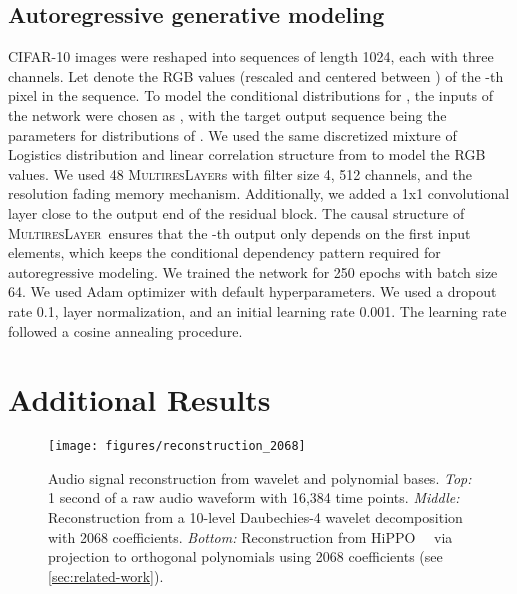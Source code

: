 \documentclass{article}
\theoremstyle{plain}
\theoremstyle{definition}
\theoremstyle{remark}
\newcommand{\ourlayer}{\textsc{MultiresLayer}}
\begin{document}
\subsection{Autoregressive generative modeling}
\label{app:ar-details}

CIFAR-10 images were reshaped into sequences of length 1024, each with three channels. 
Let  denote the RGB values (rescaled and centered between ) of the -th pixel in the sequence. 
To model the conditional distributions  for , the inputs of the network were chosen as , with the target output sequence being the parameters for distributions of . 
We used the same discretized mixture of Logistics distribution and linear correlation structure from \citet{salimans2017pixelcnn} to model the RGB values.
We used 48 \ourlayer s with filter size 4, 512 channels, and the resolution fading memory mechanism.
Additionally, we added a 1x1 convolutional layer close to the output end of the residual block. 
The causal structure of \ourlayer\ ensures that the -th output only depends on the first  input elements, which keeps the conditional dependency pattern required for autoregressive modeling.  
We trained the network for 250 epochs with batch size 64.
We used Adam optimizer with default hyperparameters. 
We used a dropout rate 0.1, layer normalization, and an initial learning rate 0.001. 
The learning rate followed a cosine annealing procedure. 

\section{Additional Results}
\label{app:other-exps}

\begin{figure}[h]
    \texttt{[image: figures/reconstruction\_2068]}
    \centering
    \vspace{-3mm}
    \caption{Audio signal reconstruction from wavelet and polynomial bases. \emph{Top:} 1 second of a raw audio waveform with 16,384 time points. \emph{Middle:} Reconstruction from a 10-level Daubechies-4 wavelet decomposition with 2068 coefficients. \emph{Bottom:} Reconstruction from HiPPO~~\citep{gu2020hippo} via projection to orthogonal polynomials using 2068 coefficients (see \cref{sec:related-work}).}  \vspace{-4mm}
\label{fig:audio}
\end{figure}
\end{document}
